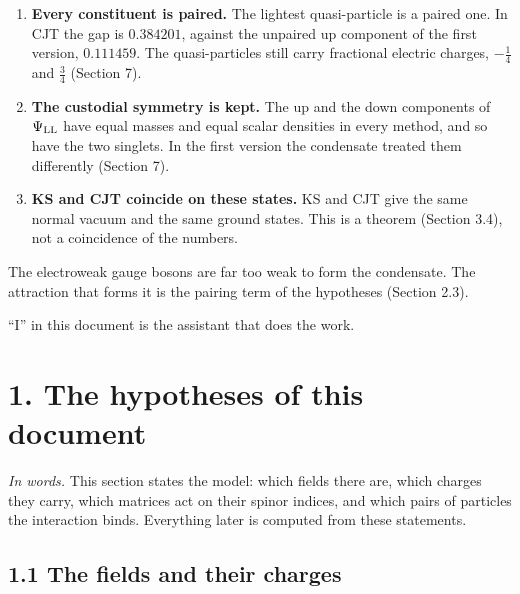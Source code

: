 \documentclass[
  10pt,
]{article}
\begin{document}
\begin{enumerate}
{  the state is stable.} Of the eight generators of the global group of
  the hypotheses (\(T^{a,{\rm SM}}\), \(T^{a,{\rm R}}_{\rm SH}\), the
  relative number and the particle number) the ground state keeps four:
  the diagonal custodial group \(SU(2)_{\rm V}\) and the relative
  number. The electric charge \(Q^{\rm SM}\) is among them; of
  \(SU(2)_L\times U(1)_Y\) it is the only one. The static response has
  exactly four eigenvalues equal to 1: the Goldstone modes of the three
  broken generators of \(SU(2)_L\times U(1)_Y\) and of the particle
  number. All its other eigenvalues are below 1, also in the directions
  that would build a charged condensate (Section 6).
\item
  \textbf{Every constituent is paired.} The lightest quasi-particle is a
  paired one. In CJT the gap is \(0.384201\), against the unpaired up
  component of the first version, \(0.111459\). The quasi-particles
  still carry fractional electric charges, \(-\tfrac14\) and
  \(\tfrac34\) (Section 7).
\item
  \textbf{The custodial symmetry is kept.} The up and the down
  components of \(\Psi_{\rm LL}\) have equal masses and equal scalar
  densities in every method, and so have the two singlets. In the first
  version the condensate treated them differently (Section 7).
\item
  \textbf{KS and CJT coincide on these states.} KS and CJT give the same
  normal vacuum and the same ground states. This is a theorem (Section
  3.4), not a coincidence of the numbers.
\end{enumerate}

The electroweak gauge bosons are far too weak to form the condensate.
The attraction that forms it is the pairing term of the hypotheses
(Section 2.3).

``I'' in this document is the assistant that does the work.

\hypertarget{the-hypotheses-of-this-document}{%
\section{1. The hypotheses of this
document}\label{the-hypotheses-of-this-document}}

\emph{In words.} This section states the model: which fields there are,
which charges they carry, which matrices act on their spinor indices,
and which pairs of particles the interaction binds. Everything later is
computed from these statements.

\hypertarget{the-fields-and-their-charges}{%
\subsection{1.1 The fields and their
charges}\label{the-fields-and-their-charges}}
\end{document}
